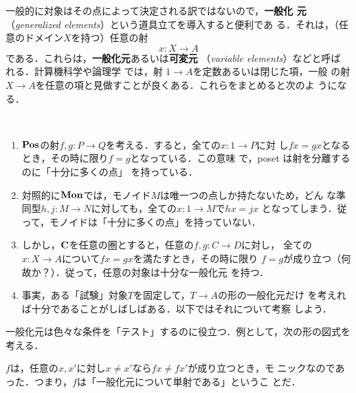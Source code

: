 一般的に対象はその点によって決定される訳ではないので，{\bfseries 一般化
元}（{\itshape generalized elements}）という道具立てを導入すると便利であ
る．それは，（任意のドメイン$X$を持つ）任意の射
\[
 x: X \to A
\]
である．これらは，{\bfseries 一般化元}あるいは{\bfseries 可変元}
（{\itshape variable elements}）などと呼ば
れる．計算機科学や論理学
では，射 $1 \to A$を定数あるいは閉じた項，一般
の射$X \to A$を任意の項と見做すことが良くある．これらをまとめると次のよ
うになる．
\begin{example}　

 \begin{enumerate}
 \item $\mathbf{Pos}$の射$f, g:P \to Q$を考える．すると，全ての$x: 1 \to P$に対
       し$fx = gx$となるとき，その時に限り$f = g$となっている．この意味
       で，poset は射を分離するのに「十分に多くの点」
       を持っている．
 \item 対照的に$\mathbf{Mon}$では，モノイド$M$は唯一つの点しか持たないため，どん
       な準同型$h, j: M \to N$に対しても，全ての$x: 1 \to M$で$hx = jx$
       となってしまう．従って，モノイドは「十分に多くの点」を持っていない．
 \item しかし，${\bf C}$を任意の圏とすると，任意の$f, g: C \to D$に対し，
       全ての $x: X \to A$について$fx = gx$を満たすとき，その時に限り
       $f = g$が成り立つ（何故か？）．従って，任意の対象は十分な一般化元
       を持つ．
 \item 事実，ある「試験」対象$T$を固定して，$T \to A$の形の一般化元だけ
       を考えれば十分であることがしばしばある．以下ではそれについて考察
       しよう．
 \end{enumerate}
\end{example}
一般化元は色々な条件を「テスト」するのに役立つ．例として，次の形の図式を
考える．
\begin{center}
\end{center}
$f$は，任意の$x, x'$に対し$x \neq x'$なら$fx \neq fx'$が成り立つとき，モ
ニックなのであった．つまり，$f$は「一般化元について単射である」というこ
とだ．

